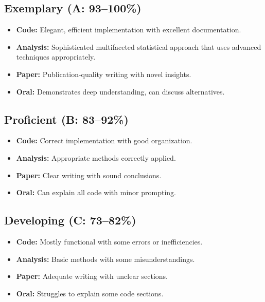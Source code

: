 \documentclass[10pt,letterpaper]{article}
\begin{document}
\subsection{Exemplary (A: 93--100\%)}
\begin{bluebox}
\begin{itemize}
  \item \textbf{Code:} Elegant, efficient implementation with excellent documentation.
  \item \textbf{Analysis:} Sophisticated multifaceted statistical approach that uses advanced techniques appropriately.
  \item \textbf{Paper:} Publication-quality writing with novel insights.
  \item \textbf{Oral:} Demonstrates deep understanding, can discuss alternatives.
\end{itemize}
\end{bluebox}

\subsection{Proficient (B: 83--92\%)}
\begin{graybox}
\begin{itemize}
  \item \textbf{Code:} Correct implementation with good organization.
  \item \textbf{Analysis:} Appropriate methods correctly applied.
  \item \textbf{Paper:} Clear writing with sound conclusions.
  \item \textbf{Oral:} Can explain all code with minor prompting.
\end{itemize}
\end{graybox}

\subsection{Developing (C: 73--82\%)}
\begin{goldbox}
\begin{itemize}
  \item \textbf{Code:} Mostly functional with some errors or inefficiencies.
  \item \textbf{Analysis:} Basic methods with some misunderstandings.
  \item \textbf{Paper:} Adequate writing with unclear sections.
  \item \textbf{Oral:} Struggles to explain some code sections.
\end{itemize}
\end{goldbox}
\end{document}
